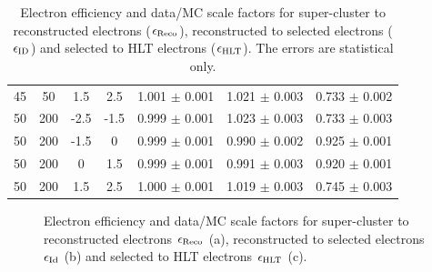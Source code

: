 \begin{table}[htb]
{\begin{tabular}{|c|c|c|c|c|c|c|}
  45 & 50 & 1.5 & 2.5 & 1.001 $\pm$ 0.001 & 1.021 $\pm$ 0.003 & 0.733 $\pm$ 0.002 \\
  50 & 200 & -2.5 & -1.5 & 0.999 $\pm$ 0.001 & 1.023 $\pm$ 0.003 & 0.733 $\pm$ 0.003 \\
  50 & 200 & -1.5 & 0 & 0.999 $\pm$ 0.001 & 0.990 $\pm$ 0.002 & 0.925 $\pm$ 0.001 \\
  50 & 200 & 0 & 1.5 & 0.999 $\pm$ 0.001 & 0.991 $\pm$ 0.003 & 0.920 $\pm$ 0.001 \\
  50 & 200 & 1.5 & 2.5 & 1.000 $\pm$ 0.001 & 1.019 $\pm$ 0.003 & 0.745 $\pm$ 0.003 \\
  \hline
  \end{tabular}}
\caption{Electron efficiency and data/MC scale factors for super-cluster to reconstructed electrons ($\epsilon_{\textnormal{Reco}}$),
    reconstructed to selected electrons ($\epsilon_{\textnormal{ID}}$) and selected to HLT electrons ($\epsilon_{\textnormal{HLT}}$). 
    The errors are statistical only.} 
\label{tab:eleEff} 
\end{table}

\begin{figure}[b]
  \begin{center}
    \caption{Electron efficiency and data/MC scale factors for super-cluster to reconstructed electrons $\epsilon_{\textnormal{Reco}}$ (a),
    reconstructed to selected electrons $\epsilon_{\textnormal{Id}}$ (b) and selected to HLT electrons
      $\epsilon_{\textnormal{HLT}}$ (c).}
    \label{fig:eleEff}
  \end{center}
\end{figure}

